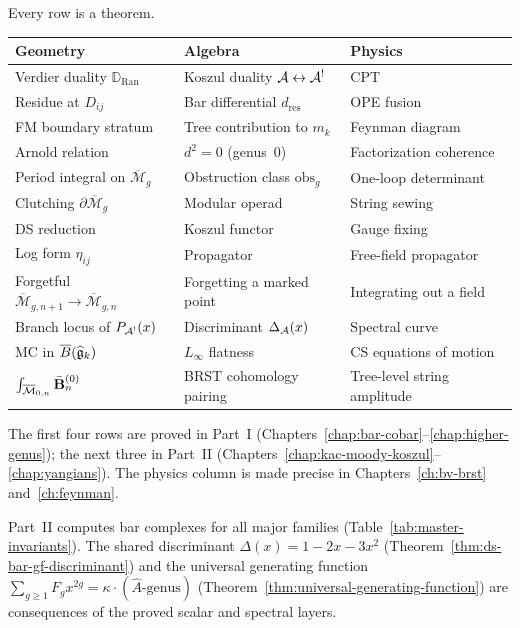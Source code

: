 \begin{remark}
\label{rem:master-functorial}
Every row is a theorem.
\begin{center}
\small
\begin{tabular}{lll}
\textbf{Geometry} & \textbf{Algebra} & \textbf{Physics} \\ \hline
Verdier duality $\mathbb{D}_{\mathrm{Ran}}$
  & Koszul duality $\mathcal{A} \leftrightarrow \mathcal{A}^!$
  & CPT \\[2pt]
Residue at $D_{ij}$
  & Bar differential $d_{\mathrm{res}}$
  & OPE fusion \\[2pt]
FM boundary stratum
  & Tree contribution to $m_k$
  & Feynman diagram \\[2pt]
Arnold relation
  & $d^2 = 0$ (genus~$0$)
  & Factorization coherence \\[2pt]
Period integral on $\overline{\mathcal{M}}_g$
  & Obstruction class $\mathrm{obs}_g$
  & One-loop determinant \\[2pt]
Clutching $\partial\overline{\mathcal{M}}_g$
  & Modular operad
  & String sewing \\[2pt]
DS reduction
  & Koszul functor
  & Gauge fixing \\[2pt]
Log form $\eta_{ij}$
  & Propagator
  & Free-field propagator \\[2pt]
Forgetful $\overline{\mathcal{M}}_{g,n+1}
  \to \overline{\mathcal{M}}_{g,n}$
  & Forgetting a marked point
  & Integrating out a field \\[2pt]
Branch locus of $P_{\mathcal{A}^!}(x)$
  & Discriminant $\Delta_{\mathcal{A}}(x)$
  & Spectral curve \\[2pt]
MC in $\overline{B}(\widehat{\mathfrak{g}}_k)$
  & $L_\infty$ flatness
  & CS equations of motion \\[2pt]
$\int_{\overline{\mathcal{M}}_{0,n}} \bar{\mathbf{B}}^{(0)}_n$
  & BRST cohomology pairing
  & Tree-level string amplitude
\end{tabular}
\end{center}
The first four rows are proved in Part~\textup{I}
(Chapters~\ref{chap:bar-cobar}--\ref{chap:higher-genus});
the next three in Part~\textup{II}
(Chapters~\ref{chap:kac-moody-koszul}--\ref{chap:yangians}).
The physics column is made precise in
Chapters~\ref{ch:bv-brst} and~\ref{ch:feynman}.
\end{remark}

Part~\textup{II} computes bar complexes for all major families
(Table~\ref{tab:master-invariants}).  The shared discriminant
$\Delta(x) = 1 - 2x - 3x^2$
(Theorem~\ref{thm:ds-bar-gf-discriminant}) and the universal
generating function
$\sum_{g \geq 1} F_g x^{2g} = \kappa \cdot (\hat{A}\text{-genus})$
(Theorem~\ref{thm:universal-generating-function}) are consequences
of the proved scalar and spectral layers.


